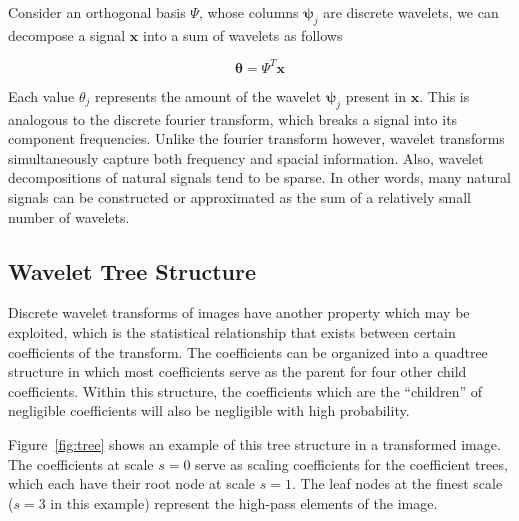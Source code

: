 \documentclass{IEEEtran}
\newcommand{\bfx}{\mathbf{x}}
\newcommand{\bfpsi}{\mathbf{\psi}}
\newcommand{\bftheta}{\mathbf{\theta}}
\begin{document}
Consider an orthogonal basis $\Psi$, whose columns $\bfpsi_j$ are discrete wavelets, we can decompose a signal $\bfx$ into a sum of wavelets as follows

\begin{equation}
  \label{eq:dwt}
  \bftheta = \Psi^T \bfx
\end{equation}

Each value $\theta_j$ represents the amount of the wavelet $\bfpsi_j$ present in $\bfx$. This is analogous to the discrete fourier transform, which breaks a signal into its component frequencies. Unlike the fourier transform however, wavelet transforms simultaneously capture both frequency and spacial information. Also, wavelet decompositions of natural signals tend to be sparse.  In other words, many natural signals can be constructed or approximated as the sum of a relatively small number of wavelets.

\subsection{Wavelet Tree Structure}
Discrete wavelet transforms of images have another property which may be exploited, which is the statistical relationship that exists between certain coefficients of the transform. The coefficients can be organized into a quadtree structure in which most coefficients serve as the parent for four other child coefficients. Within this structure, the coefficients which are the ``children'' of negligible coefficients will also be negligible with high probability.

Figure~\ref{fig:tree} shows an example of this tree structure in a transformed image.  The coefficients at scale $s=0$ serve as scaling coefficients for the coefficient trees, which each have their root node at scale $s=1$. The leaf nodes at the finest scale ($s=3$ in this example) represent the high-pass elements of the image.
\end{document}
